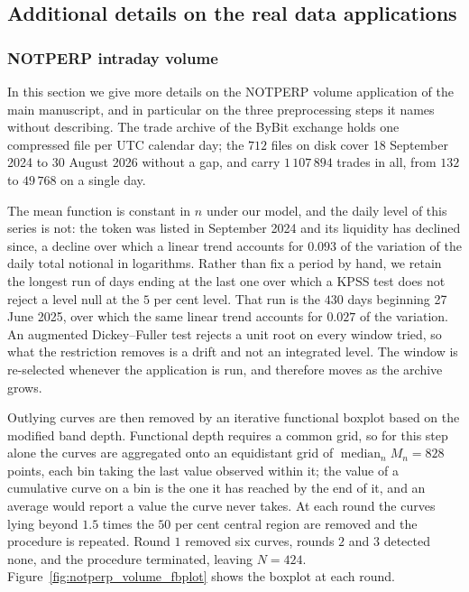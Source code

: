 \subsection{\color{magenta}Additional details on the real data applications\color{black}}

\subsubsection{\color{magenta}NOTPERP intraday volume\color{black}}

\color{magenta}
In this section we give more details on the NOTPERP volume application of the main manuscript, and in particular on the three preprocessing steps it names without describing. The trade archive of the ByBit exchange holds one compressed file per UTC calendar day; the $712$ files on disk cover 18 September 2024 to 30 August 2026 without a gap, and carry $1\,107\,894$ trades in all, from $132$ to $49\,768$ on a single day.

The mean function is constant in $n$ under our model, and the daily level of this series is not: the token was listed in September 2024 and its liquidity has declined since, a decline over which a linear trend accounts for $0.093$ of the variation of the daily total notional in logarithms. Rather than fix a period by hand, we retain the longest run of days ending at the last one over which a KPSS test does not reject a level null at the $5$ per cent level. That run is the $430$ days beginning 27 June 2025, over which the same linear trend accounts for $0.027$ of the variation. An augmented Dickey--Fuller test rejects a unit root on every window tried, so what the restriction removes is a drift and not an integrated level. The window is re-selected whenever the application is run, and therefore moves as the archive grows.

Outlying curves are then removed by an iterative functional boxplot based on the modified band depth. Functional depth requires a common grid, so for this step alone the curves are aggregated onto an equidistant grid of $\operatorname{median}_n M_n = 828$ points, each bin taking the last value observed within it; the value of a cumulative curve on a bin is the one it has reached by the end of it, and an average would report a value the curve never takes. At each round the curves lying beyond $1.5$ times the $50$ per cent central region are removed and the procedure is repeated. Round $1$ removed six curves, rounds $2$ and $3$ detected none, and the procedure terminated, leaving $N = 424$. Figure~\ref{fig:notperp_volume_fbplot} shows the boxplot at each round.

